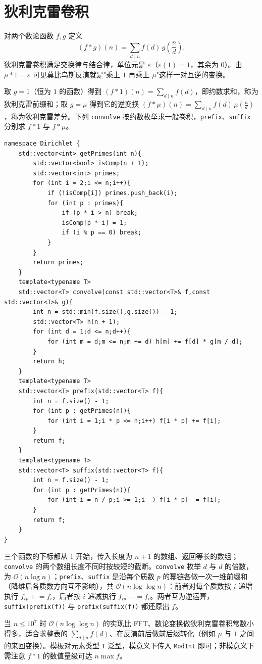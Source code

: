 \section{狄利克雷卷积}

对两个数论函数 $f,g$ 定义
$$(f*g)(n)=\sum_{d\mid n}f(d)\,g\!\left(\frac nd\right).$$
狄利克雷卷积满足交换律与结合律，单位元是 $\varepsilon$（$\varepsilon(1)=1$，其余为 $0$）。由 $\mu*1=\varepsilon$ 可见莫比乌斯反演就是"乘上 $1$ 再乘上 $\mu$"这样一对互逆的变换。

取 $g=1$（恒为 $1$ 的函数）得到 $(f*1)(n)=\sum_{d\mid n}f(d)$，即约数求和，称为狄利克雷前缀和；取 $g=\mu$ 得到它的逆变换 $(f*\mu)(n)=\sum_{d\mid n}f(d)\,\mu(\frac nd)$，称为狄利克雷差分。下列 \texttt{convolve} 按约数枚举求一般卷积，\texttt{prefix}、\texttt{suffix} 分别求 $f*1$ 与 $f*\mu$。

\begin{lstlisting}
namespace Dirichlet {
    std::vector<int> getPrimes(int n){
        std::vector<bool> isComp(n + 1);
        std::vector<int> primes;
        for (int i = 2;i <= n;i++){
            if (!isComp[i]) primes.push_back(i);
            for (int p : primes){
                if (p * i > n) break;
                isComp[p * i] = 1;
                if (i % p == 0) break;
            }
        }
        return primes;
    }
    template<typename T>
    std::vector<T> convolve(const std::vector<T>& f,const std::vector<T>& g){
        int n = std::min(f.size(),g.size()) - 1;
        std::vector<T> h(n + 1);
        for (int d = 1;d <= n;d++){
            for (int m = d;m <= n;m += d) h[m] += f[d] * g[m / d];
        }
        return h;
    }
    template<typename T>
    std::vector<T> prefix(std::vector<T> f){
        int n = f.size() - 1;
        for (int p : getPrimes(n)){
            for (int i = 1;i * p <= n;i++) f[i * p] += f[i];
        }
        return f;
    }
    template<typename T>
    std::vector<T> suffix(std::vector<T> f){
        int n = f.size() - 1;
        for (int p : getPrimes(n)){
            for (int i = n / p;i >= 1;i--) f[i * p] -= f[i];
        }
        return f;
    }
}
\end{lstlisting}

三个函数的下标都从 $1$ 开始，传入长度为 $n+1$ 的数组、返回等长的数组；\texttt{convolve} 的两个数组长度不同时按较短的截断。\texttt{convolve} 枚举 $d$ 与 $d$ 的倍数，为 $\mathcal{O}(n\log n)$；\texttt{prefix}、\texttt{suffix} 是沿每个质数 $p$ 的幂链各做一次一维前缀和（降维后各质数方向互不影响），共 $\mathcal{O}(n\log\log n)$：前者对每个质数按 $i$ 递增执行 $f_{ip}\mathrel{+}=f_i$，后者按 $i$ 递减执行 $f_{ip}\mathrel{-}=f_i$。两者互为逆运算，\texttt{suffix(prefix(f))} 与 \texttt{prefix(suffix(f))} 都还原出 $f$。

当 $n\le10^7$ 时 $\mathcal{O}(n\log\log n)$ 的实现比 FFT、数论变换做狄利克雷卷积常数小得多，适合求整表的 $\sum_{d\mid n}f(d)$、在反演前后做前后缀转化（例如 $\mu$ 与 $1$ 之间的来回变换）。模板对元素类型 \texttt{T} 泛型，模意义下传入 \texttt{ModInt} 即可；非模意义下需注意 $f*1$ 的数值量级可达 $n\max f$。
